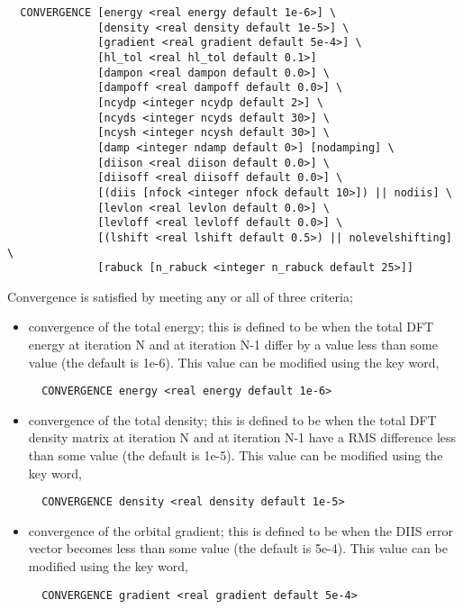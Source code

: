 \begin{verbatim}
  CONVERGENCE [energy <real energy default 1e-6>] \
              [density <real density default 1e-5>] \
              [gradient <real gradient default 5e-4>] \
              [hl_tol <real hl_tol default 0.1>]
              [dampon <real dampon default 0.0>] \
              [dampoff <real dampoff default 0.0>] \
              [ncydp <integer ncydp default 2>] \
              [ncyds <integer ncyds default 30>] \
              [ncysh <integer ncysh default 30>] \
              [damp <integer ndamp default 0>] [nodamping] \
              [diison <real diison default 0.0>] \
              [diisoff <real diisoff default 0.0>] \
              [(diis [nfock <integer nfock default 10>]) || nodiis] \
              [levlon <real levlon default 0.0>] \
              [levloff <real levloff default 0.0>] \
              [(lshift <real lshift default 0.5>) || nolevelshifting] \
              [rabuck [n_rabuck <integer n_rabuck default 25>]]
\end{verbatim}

Convergence is satisfied by meeting any or all of three criteria;
\begin{itemize}
\item convergence of the total energy; this is defined to be when the
  total DFT energy at iteration N and at iteration N-1 differ by a value less
  than some value (the default is 1e-6).  This value can be modified
  using the key word,
\begin{verbatim}
  CONVERGENCE energy <real energy default 1e-6>
\end{verbatim}

\item convergence of the total density; this is defined to be when the
  total DFT density matrix at iteration N and at iteration N-1 have a
  RMS difference less than some value (the default is 1e-5).  This value can be modified
  using the key word,
\begin{verbatim}
  CONVERGENCE density <real density default 1e-5>
\end{verbatim}

\item convergence of the orbital gradient; this is defined to be when the
  DIIS error vector becomes less than some value (the default is
  5e-4).  This value can be modified using the key word,
\begin{verbatim}
  CONVERGENCE gradient <real gradient default 5e-4>
\end{verbatim}
\end{itemize}

